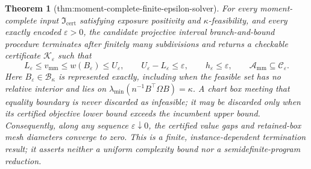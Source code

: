 \documentclass{article}
\newtheorem{theorem}{Theorem}
\begin{document}
\begin{theorem}[thm:moment-complete-finite-epsilon-solver]\label{thm:moment-complete-finite-epsilon-solver}
For every moment-complete input \(\mathfrak I_{\mathrm{cert}}\) satisfying exposure positivity and \(\kappa\)-feasibility, and every exactly encoded \(\varepsilon>0\), the candidate projective interval branch-and-bound procedure terminates after finitely many subdivisions and returns a checkable certificate \(\mathscr K_{\varepsilon}\) such that
\[
L_{\varepsilon}\le v_{\mathrm{mm}}\le w(B_{\varepsilon})\le U_{\varepsilon},
\qquad
U_{\varepsilon}-L_{\varepsilon}\le\varepsilon,
\qquad
h_{\varepsilon}\le\varepsilon,
\qquad
\mathcal A_{\mathrm{mm}}\subseteq\mathcal C_{\varepsilon}.
\]
Here \(B_{\varepsilon}\in\mathcal B_\kappa\) is represented exactly, including when the feasible set has no relative interior and lies on \(\lambda_{\min}(n^{-1}B^{\top}\Omega B)=\kappa\).  A chart box meeting that equality boundary is never discarded as infeasible; it may be discarded only when its certified objective lower bound exceeds the incumbent upper bound.  Consequently, along any sequence \(\varepsilon\downarrow0\), the certified value gaps and retained-box mesh diameters converge to zero.  This is a finite, instance-dependent termination result; it asserts neither a uniform complexity bound nor a semidefinite-program reduction.
\end{theorem}
\end{document}
